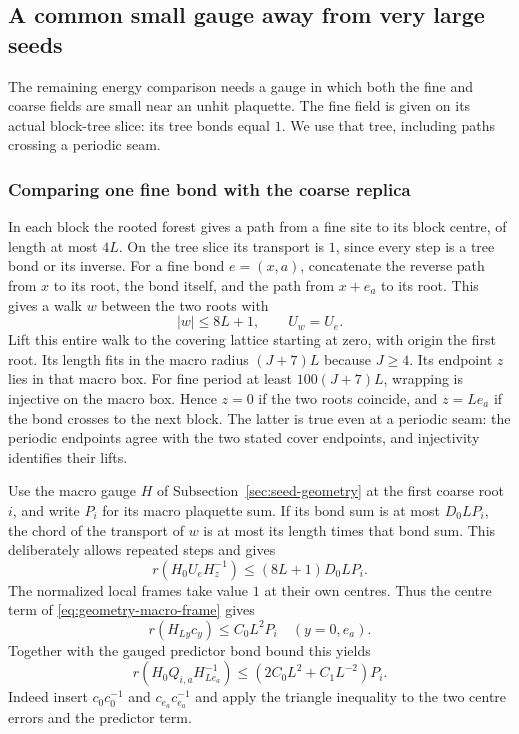 \subsection{A common small gauge away from very large seeds}
\label{sec:seed-tree-patch}
The remaining energy comparison needs a gauge in which both the fine
and coarse fields are small near an unhit plaquette. The fine field
is given on its actual block-tree slice: its tree bonds equal $1$.
We use that tree, including paths crossing a periodic seam.

\subsubsection{Comparing one fine bond with the coarse replica}
In each block the rooted forest gives a path from a fine site to its
block centre, of length at most $4L$. On the tree slice its transport
is $1$, since every step is a tree bond or its inverse. For a fine
bond $e=(x,a)$, concatenate the reverse path from $x$ to its root,
the bond itself, and the path from $x+e_a$ to its root. This gives a
walk $w$ between the two roots with
\[
 |w|\le8L+1,\qquad U_w=U_e.
\]
Lift this entire walk to the covering lattice starting at zero,
with origin the first root. Its length fits in the macro radius
$(J+7)L$ because $J\ge4$. Its endpoint $z$ lies in that macro box.
For fine period at least $100(J+7)L$, wrapping is injective on the
macro box. Hence $z=0$ if the two roots coincide, and $z=Le_a$ if
the bond crosses to the next block. The latter is true even at a
periodic seam: the periodic endpoints agree with the two stated
cover endpoints, and injectivity identifies their lifts.

Use the macro gauge $H$ of Subsection~\ref{sec:seed-geometry} at the
first coarse root $i$, and write $P_i$ for its macro plaquette sum.
If its bond sum is at most $D_0LP_i$, the chord of the transport of
$w$ is at most its length times that bond sum. This deliberately
allows repeated steps and gives
\begin{equation}\label{eq:tree-fine-link}
 r(H_0U_eH_z^{-1})\le (8L+1)D_0L P_i.
\end{equation}
The normalized local frames take value $1$ at their own centres.
Thus the centre term of \eqref{eq:geometry-macro-frame} gives
\[
 r(H_{Ly}c_y)\le C_0L^2P_i\quad(y=0,e_a).
\]
Together with the gauged predictor bond bound this yields
\[
 r(H_0Q_{i,a}H_{Le_a}^{-1})
       \le(2C_0L^2+C_1L^{-2})P_i.
\]
Indeed insert $c_0c_0^{-1}$ and $c_{e_a}c_{e_a}^{-1}$ and apply the
triangle inequality to the two centre errors and the predictor term.

